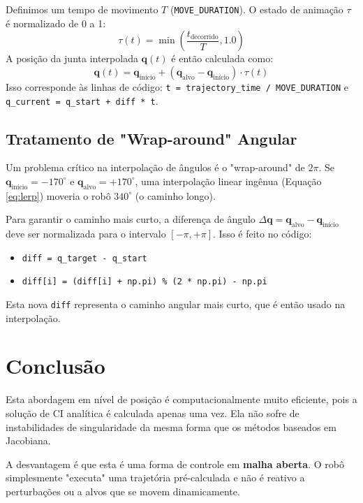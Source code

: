 \documentclass[a4paper, 12pt]{article}
\begin{document}
Definimos um tempo de movimento $T$ (\texttt{MOVE\_DURATION}). O estado de animação $\tau$ é normalizado de 0 a 1:
\[
\tau(t) = \min\left( \frac{t_{\text{decorrido}}}{T}, 1.0 \right)
\]
A posição da junta interpolada $\mathbf{q}(t)$ é então calculada como:
\begin{equation}
\mathbf{q}(t) = \mathbf{q}_{\text{início}} + (\mathbf{q}_{\text{alvo}} - \mathbf{q}_{\text{início}}) \cdot \tau(t)
\label{eq:lerp}
\end{equation}
Isso corresponde às linhas de código: \texttt{t = trajectory\_time / MOVE\_DURATION} e \texttt{q\_current = q\_start + diff * t}.

\subsection{Tratamento de "Wrap-around" Angular}
Um problema crítico na interpolação de ângulos é o "wrap-around" de $2\pi$. Se $\mathbf{q}_{\text{início}} = -170^\circ$ e $\mathbf{q}_{\text{alvo}} = +170^\circ$, uma interpolação linear ingênua (Equação \ref{eq:lerp}) moveria o robô $340^\circ$ (o caminho longo).

Para garantir o caminho mais curto, a diferença de ângulo $\Delta \mathbf{q} = \mathbf{q}_{\text{alvo}} - \mathbf{q}_{\text{início}}$ deve ser normalizada para o intervalo $[-\pi, +\pi]$. Isso é feito no código:
\begin{itemize}
    \item \texttt{diff = q\_target - q\_start}
    \item \texttt{diff[i] = (diff[i] + np.pi) \% (2 * np.pi) - np.pi}
\end{itemize}
Esta nova \texttt{diff} representa o caminho angular mais curto, que é então usado na interpolação.

\section{Conclusão}
Esta abordagem em nível de posição é computacionalmente muito eficiente, pois a solução de CI analítica é calculada apenas uma vez. Ela não sofre de instabilidades de singularidade da mesma forma que os métodos baseados em Jacobiana.

A desvantagem é que esta é uma forma de controle em \textbf{malha aberta}. O robô simplesmente "executa" uma trajetória pré-calculada e não é reativo a perturbações ou a alvos que se movem dinamicamente.
\end{document}
